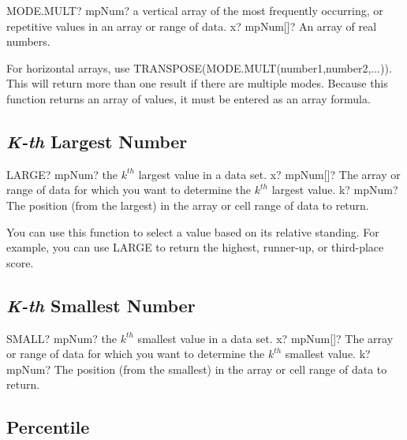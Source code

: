 \vspace{0.6cm}
\begin{mpFunctionsExtract}
	\mpWorksheetFunctionOneNotImplemented
	{MODE.MULT? mpNum? a vertical array of the most frequently occurring, or repetitive values in an array or range of data.}
	{x? mpNum[]? An array of real numbers.}
\end{mpFunctionsExtract}

For horizontal arrays, use \textsf{TRANSPOSE(MODE.MULT(number1,number2,...))}.
This will return more than one result if there are multiple modes. Because this function returns an array of values, it must be entered as an array formula.




\subsection{\textsl{K-th} Largest Number}

\begin{mpFunctionsExtract}
	\mpWorksheetFunctionTwoNotImplemented
	{LARGE? mpNum? the $k^{th}$ largest value in a data set.}
	{x? mpNum[]?  The array or range of data for which you want to determine the $k^{th}$ largest value.}
	{k? mpNum? The position (from the largest) in the array or cell range of data to return.}
\end{mpFunctionsExtract}

\vspace{0.3cm}
You can use this function to select a value based on its relative standing. For example, you can use \textsf{LARGE} to return the highest, runner-up, or third-place score.




\subsection{\textsl{K-th} Smallest Number}

\begin{mpFunctionsExtract}
	\mpWorksheetFunctionTwoNotImplemented
	{SMALL? mpNum? the $k^{th}$ smallest value in a data set.}
	{x? mpNum[]?  The array or range of data for which you want to determine the $k^{th}$ smallest value.}
	{k? mpNum? The position (from the smallest) in the array or cell range of data to return.}
\end{mpFunctionsExtract}





\subsection{Percentile}

